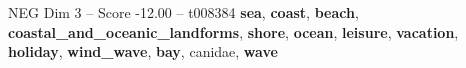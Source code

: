 \begin{textsample}{NEG Dim 3 – Score -12.00 – t008384}  \label{ex:f3_neg_030}
\textbf{sea}, \textbf{coast}, \textbf{beach}, \textbf{coastal\_and\_oceanic\_landforms}, \textbf{shore}, \textbf{ocean}, \textbf{leisure}, \textbf{vacation}, \textbf{holiday}, \textbf{wind\_wave}, \textbf{bay}, canidae, \textbf{wave}

\end{textsample}
